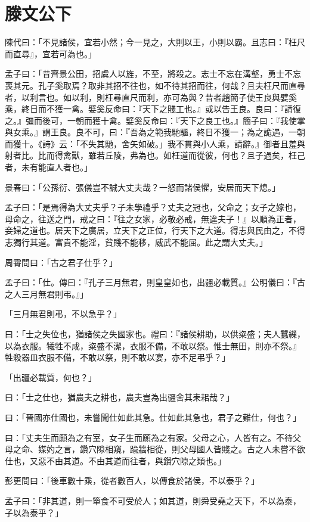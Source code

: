 \documentclass[12pt,a4paper]{ctexbook}
\begin{document}
\section{滕文公下}
陳代曰：「不見諸侯，宜若小然；今一見之，大則以王，小則以霸。且志曰：『枉尺而直尋』，宜若可為也。」\par
孟子曰：「昔齊景公田，招虞人以旌，不至，將殺之。志士不忘在溝壑，勇士不忘喪其元。孔子奚取焉？取非其招不往也，如不待其招而往，何哉？且夫枉尺而直尋者，以利言也。如以利，則枉尋直尺而利，亦可為與？昔者趙簡子使王良與嬖奚乘，終日而不獲一禽。嬖奚反命曰：『天下之賤工也。』或以告王良。良曰：『請復之。』彊而後可，一朝而獲十禽。嬖奚反命曰：『天下之良工也。』簡子曰：『我使掌與女乘。』謂王良。良不可，曰：『吾為之範我馳驅，終日不獲一；為之詭遇，一朝而獲十。《詩》云：「不失其馳，舍矢如破。」我不貫與小人乘，請辭。』御者且羞與射者比。比而得禽獸，雖若丘陵，弗為也。如枉道而從彼，何也？且子過矣，枉己者，未有能直人者也。」\par
景春曰：「公孫衍、張儀豈不誠大丈夫哉？一怒而諸侯懼，安居而天下熄。」\par
孟子曰：「是焉得為大丈夫乎？子未學禮乎？丈夫之冠也，父命之；女子之嫁也，母命之，往送之門，戒之曰：『往之女家，必敬必戒，無違夫子！』以順為正者，妾婦之道也。居天下之廣居，立天下之正位，行天下之大道。得志與民由之，不得志獨行其道。富貴不能淫，貧賤不能移，威武不能屈。此之謂大丈夫。」\par
周霄問曰：「古之君子仕乎？」\par
孟子曰：「仕。傳曰：『孔子三月無君，則皇皇如也，出疆必載質。』公明儀曰：『古之人三月無君則弔。』」\par
「三月無君則弔，不以急乎？」\par
曰：「士之失位也，猶諸侯之失國家也。禮曰：『諸侯耕助，以供粢盛；夫人蠶繅，以為衣服。犧牲不成，粢盛不潔，衣服不備，不敢以祭。惟士無田，則亦不祭。』牲殺器皿衣服不備，不敢以祭，則不敢以宴，亦不足弔乎？」\par
「出疆必載質，何也？」\par
曰：「士之仕也，猶農夫之耕也，農夫豈為出疆舍其耒耜哉？」\par
曰：「晉國亦仕國也，未嘗聞仕如此其急。仕如此其急也，君子之難仕，何也？」\par
曰：「丈夫生而願為之有室，女子生而願為之有家。父母之心，人皆有之。不待父母之命、媒妁之言，鑽穴隙相窺，踰牆相從，則父母國人皆賤之。古之人未嘗不欲仕也，又惡不由其道。不由其道而往者，與鑽穴隙之類也。」\par
彭更問曰：「後車數十乘，從者數百人，以傳食於諸侯，不以泰乎？」\par
孟子曰：「非其道，則一簞食不可受於人；如其道，則舜受堯之天下，不以為泰，子以為泰乎？」\par
\end{document}
